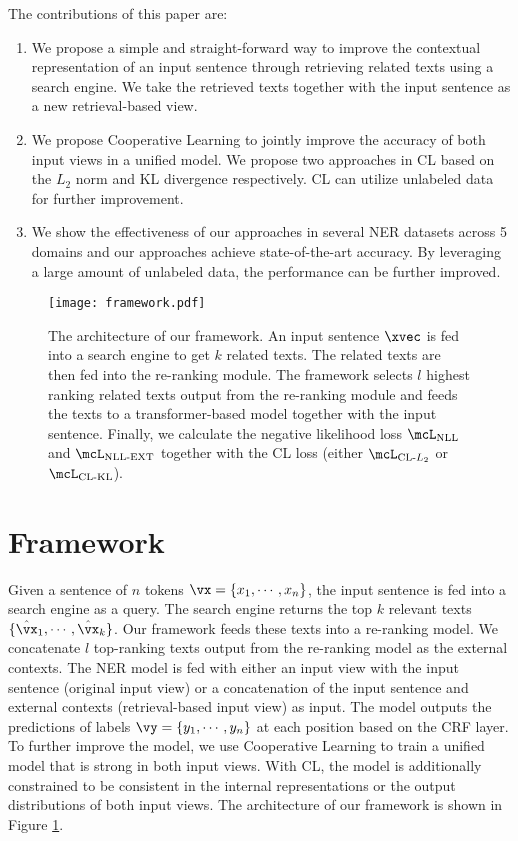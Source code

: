 The contributions of this paper are:
\begin{enumerate}[leftmargin=*]
    \item We propose a simple and straight-forward way to improve the contextual representation of an input sentence through retrieving related texts using a search engine. We take the retrieved texts together with the input sentence as a new retrieval-based view.
    \item 
    We propose Cooperative Learning to jointly improve the accuracy of both input views in a unified model. We propose two approaches in CL based on the $L_2$ norm and KL divergence respectively. CL can utilize unlabeled data for further improvement.
    \item We show the effectiveness of our approaches in several NER datasets across 5 domains and our approaches achieve state-of-the-art accuracy. By leveraging a large amount of unlabeled data, the performance can be further improved. %
\end{enumerate}
\begin{figure*}[ht]
	\centering
	\texttt{[image: framework.pdf]}
	\caption{The architecture of our framework. An input sentence $\xvec$ is fed into a search engine to get $k$ related texts. The related texts are then fed into the re-ranking module. The framework selects $l$ highest ranking related texts output from the re-ranking module and feeds the texts to a transformer-based model together with the input sentence. Finally, we calculate the negative likelihood loss $\mcL_{\text{NLL}}$ and $\mcL_{\text{NLL-EXT}}$ together with the CL loss (either $\mcL_{\text{CL-}L_2}$ or $\mcL_{\text{CL-KL}}$).}
	\label{fig:architecture}
\end{figure*}

\section{Framework}
Given a sentence of $n$ tokens $\vx = \{x_1, \cdots, x_n\}$, the input sentence is fed into a search engine as a query. The search engine returns the top $k$ relevant texts $\{\hat{\vx}_1, \cdots, \hat{\vx}_k\}$. Our framework feeds these texts into a re-ranking model. We concatenate $l$ top-ranking texts output from the re-ranking model as the external contexts. The NER model is fed with either an input view with the input sentence (original input view) or a concatenation of the input sentence and external contexts (retrieval-based input view) as input. The model outputs the predictions of labels $\vy = \{y_1, \cdots, y_n\}$ at each position based on the CRF layer. To further improve the model, we use Cooperative Learning to train a unified model that is strong in both input views. With CL, the model is additionally constrained to be consistent in the internal representations or the output distributions of both input views. The architecture of our framework is shown in Figure \ref{fig:architecture}.

